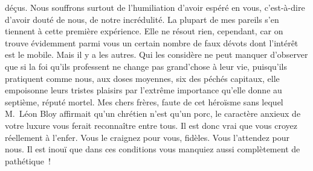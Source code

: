 \documentclass[french,twoside]{book} %
\newcommand{\astertri}{\medskip\par\centerline{\color{rubric}\large\selectfont{\syms ✻\,✻\,✻}}\medskip\par}%
\begin{document}
déçus. Nous souffrons surtout de l’humiliation d’avoir espéré en vous, c’est-à-dire d’avoir douté de nous, de notre incrédulité. La plupart de mes pareils s’en tiennent à cette première expérience. Elle ne résout rien, cependant, car on trouve évidemment parmi vous un certain nombre de faux dévots dont l’intérêt est le mobile. Mais il y a les autres. Qui les considère ne peut manquer d’observer que si la foi qu’ils professent ne change pas grand’chose à leur vie, puisqu’ils pratiquent comme nous, aux doses moyennes, six des péchés capitaux, elle empoisonne leurs tristes plaisirs par l’extrême importance qu’elle donne au septième, réputé mortel. Mes chers frères, faute de cet héroïsme sans lequel M. Léon Bloy affirmait qu’un chrétien n’est qu’un porc, le caractère anxieux de votre luxure vous ferait reconnaître entre tous. Il est donc vrai que vous croyez réellement à l’enfer. Vous le craignez pour vous, fidèles. Vous l’attendez pour nous. Il est inouï que dans ces conditions vous manquiez aussi complètement de pathétique !\par
 \par

\astertri
\end{document}
